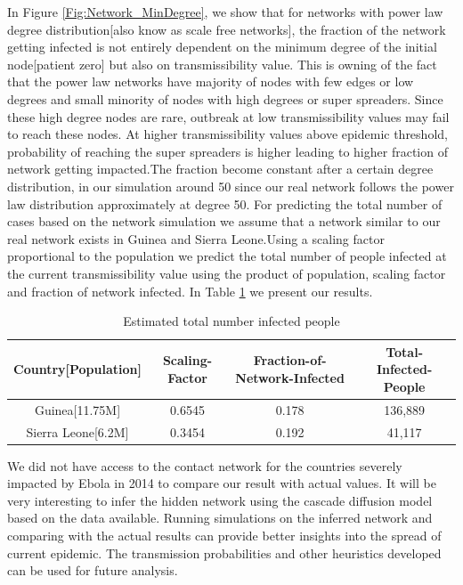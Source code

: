 \documentclass[10pt, journal,onecolumn]{IEEEtran}
\begin{document}
In Figure \ref{Fig:Network_MinDegree}, we show that  for networks with power law degree distribution[also know as scale free networks], the fraction of the network getting infected is not entirely dependent on the minimum degree of the  initial node[patient zero] but also on transmissibility value. This is owning of the fact that the power law networks have majority  of nodes with few edges or low degrees and small minority of nodes with high degrees or super spreaders. Since these high degree nodes are rare, outbreak at low transmissibility values  may fail to reach these nodes. At higher transmissibility values above epidemic threshold, probability of reaching the super spreaders is higher leading to higher fraction of network getting impacted.The fraction become constant after a certain degree distribution, in our simulation around 50 since our real network follows the power law distribution approximately at degree 50. For predicting the total number of cases based on the network simulation we assume that a  network similar to our real network exists in Guinea and Sierra Leone.Using a scaling factor proportional to the population we predict the total number of people infected at the current transmissibility value using the product of population, scaling factor and fraction of network infected. In Table \ref{Tb:prediction_networkm} we present our results.
\begin{table}[h]
\caption{Estimated total number infected people} 
\centering
\begin{tabular}{|c|c|c|c|}
\hline 
Country[Population] & Scaling-Factor & Fraction-of-Network-Infected & Total-Infected-People 
\tabularnewline
\hline 
\hline 
Guinea[11.75M] & 0.6545 & 0.178 & 136,889\tabularnewline
\hline 
Sierra Leone[6.2M] & 0.3454 & 0.192 & 41,117\tabularnewline
\hline 
\end{tabular}
\label{Tb:prediction_networkm}

\end{table}




We did not have access to the  contact network for the countries  severely impacted by Ebola in 2014 to compare our result with actual values.  It will be  very interesting to infer the hidden network using the cascade diffusion model based on the data available. Running simulations on  the inferred network and comparing  with the actual results can provide better insights into the spread of  current epidemic. The transmission probabilities and other heuristics developed can be used for future analysis.
\end{document}
